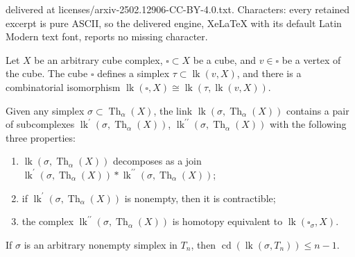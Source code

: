 \documentclass[10pt,a4paper]{amsart}
\newcommand{\Th}{\operatorname{Th}}
\newcommand{\cdim}{\operatorname{cd}}
\newcommand{\lk}{\operatorname{lk}}
\begin{document}
delivered at licenses/arxiv-2502.12906-CC-BY-4.0.txt. Characters: every retained excerpt is pure ASCII, so the delivered engine, XeLaTeX with its default Latin Modern text font, reports no missing character.
\begin{lem}\label{lem:links-cube-to-vertex}
    Let $X$ be an arbitrary cube complex, $\square \subset X$ be a cube, and $v\in \square$ be a vertex of the cube. The cube $\square$ defines a simplex $\tau \subset \lk(v,X)$, and there is a combinatorial isomorphism $\lk(\square, X) \cong \lk(\tau, \lk(v,X))$.
\end{lem}

\begin{lem}\label{lem:three-props}
Given any simplex $\sigma \subset \Th_\alpha(X)$, the link $\lk(\sigma, \Th_\alpha(X))$ contains a pair of subcomplexes $\lk^\prime(\sigma, \Th_\alpha(X))$, $\lk^{\prime \prime}(\sigma, \Th_\alpha(X))$ with the following three properties:
\begin{enumerate}
\item $\lk(\sigma, \Th_\alpha(X))$ decomposes as a join $\lk^\prime(\sigma, \Th_\alpha(X))*\lk^{\prime \prime}(\sigma, \Th_\alpha(X))$;
\item if $\lk^\prime(\sigma, \Th_\alpha(X))$ is nonempty, then it is contractible;
\item the complex $\lk^{\prime \prime}(\sigma, \Th_\alpha(X))$ is homotopy equivalent to $\lk(\square_\sigma , X)$.
\end{enumerate}
\end{lem}

\begin{lem}\label{lem:cdim-of-links}
    If $\sigma$ is an arbitrary nonempty simplex in $T_n$, then $\cdim(\lk(\sigma, T_n)) \leq n-1$.
\end{lem}
\end{document}
